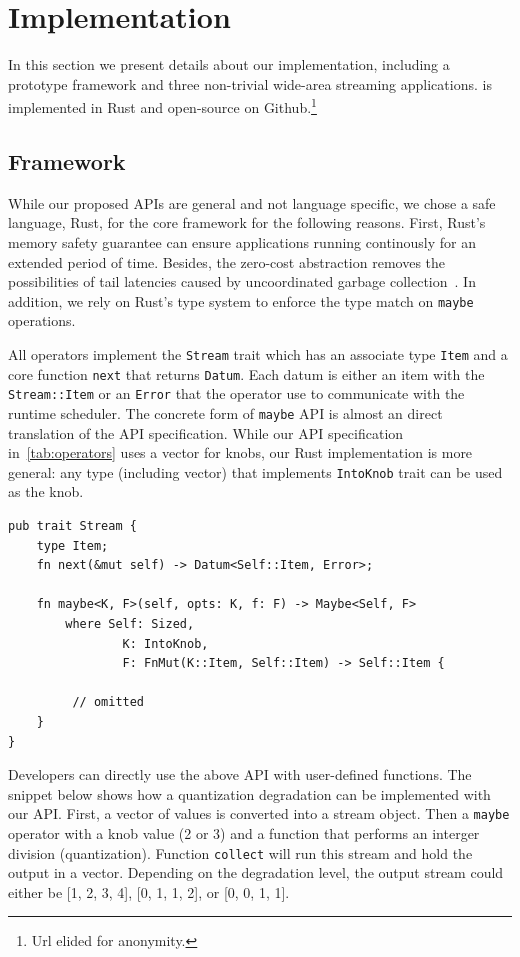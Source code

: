 \section{Implementation}
\label{sec:implementation}

In this section we present details about our implementation, including a
prototype framework and three non-trivial wide-area streaming applications.
\sysname{} is implemented in Rust and open-source on Github.\footnote{Url elided
  for anonymity.}

\subsection{Framework}
\label{sec:framework}

While our proposed APIs are general and not language specific, we chose a safe
language, Rust, for the core framework for the following reasons. First, Rust's
memory safety guarantee can ensure applications running continously for an
extended period of time. Besides, the zero-cost abstraction removes the
possibilities of tail latencies caused by uncoordinated garbage
collection~\cite{maas2016taurus}. In addition, we rely on Rust's type system to
enforce the type match on \texttt{maybe} operations.

All operators implement the \texttt{Stream} trait which has an associate type
\texttt{Item} and a core function \texttt{next} that returns
\texttt{Datum}. Each datum is either an item with the \texttt{Stream::Item} or
an \texttt{Error} that the operator use to communicate with the runtime
scheduler. The concrete form of \texttt{maybe} API is almost an direct
translation of the API specification. While our API specification
in~\autoref{tab:operators} uses a vector for knobs, our Rust implementation is
more general: any type (including vector) that implements \texttt{IntoKnob}
trait can be used as the knob.

\begin{lstlisting}
pub trait Stream {
    type Item;
    fn next(&mut self) -> Datum<Self::Item, Error>;

    fn maybe<K, F>(self, opts: K, f: F) -> Maybe<Self, F>
        where Self: Sized,
                K: IntoKnob,
                F: FnMut(K::Item, Self::Item) -> Self::Item {

         // omitted
    }
}
\end{lstlisting}

Developers can directly use the above API with user-defined functions. The
snippet below shows how a quantization degradation can be implemented with our
API. First, a vector of values is converted into a stream object. Then a
\texttt{maybe} operator with a knob value (2 or 3) and a function that performs
an interger division (quantization). Function \texttt{collect} will run this
stream and hold the output in a vector. Depending on the degradation level, the
output stream could either be [1, 2, 3, 4], [0, 1, 1, 2], or [0, 0, 1, 1].

